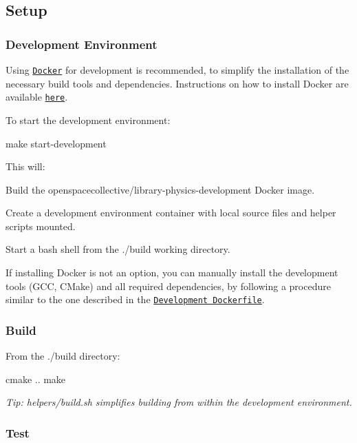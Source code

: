 \subsection*{Setup}

\subsubsection*{Development Environment}

Using \href{https://www.docker.com}{\tt Docker} for development is recommended, to simplify the installation of the necessary build tools and dependencies. Instructions on how to install Docker are available \href{https://docs.docker.com/install/}{\tt here}.

To start the development environment\+:


\begin{DoxyCode}
make start-development
\end{DoxyCode}


This will\+:


\begin{DoxyEnumerate}
\item Build the {\ttfamily openspacecollective/library-\/physics-\/development} Docker image.
\item Create a development environment container with local source files and helper scripts mounted.
\item Start a {\ttfamily bash} shell from the {\ttfamily ./build} working directory.
\end{DoxyEnumerate}

If installing Docker is not an option, you can manually install the development tools (G\+CC, C\+Make) and all required dependencies, by following a procedure similar to the one described in the \href{./docker/development/Dockerfile}{\tt Development Dockerfile}.

\subsubsection*{Build}

From the {\ttfamily ./build} directory\+:


\begin{DoxyCode}
cmake ..
make
\end{DoxyCode}


{\itshape Tip\+: {\ttfamily helpers/build.\+sh} simplifies building from within the development environment.}

\subsubsection*{Test}

